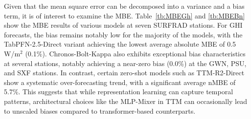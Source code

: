 \documentclass[number, 3p, 10pt, times]{elsarticle}
\begin{document}
Given that the mean square error can be decomposed into a variance and a bias term, it is of interest to examine the MBE. Table~\ref{tb:MBEGh} and \ref{tb:MBEBn} show the MBE results of various models at seven SURFRAD stations. For GHI forecasts, the bias remains notably low for the majority of the models, with the TabPFN-2.5-Direct variant achieving the lowest average absolute MBE of 0.5 W/m$^2$ (0.1\%). Chronos-Bolt-Kappa also exhibits exceptional bias characteristics at several stations, notably achieving a near-zero bias (0.0\%) at the GWN, PSU, and SXF stations. In contrast, certain zero-shot models such as TTM-R2-Direct show a systematic over-forecasting trend, with a significant average nMBE of 5.7\%. This suggests that while representation learning can capture temporal patterns, architectural choices like the MLP-Mixer in TTM can occasionally lead to unscaled biases compared to transformer-based counterparts.
\end{document}
